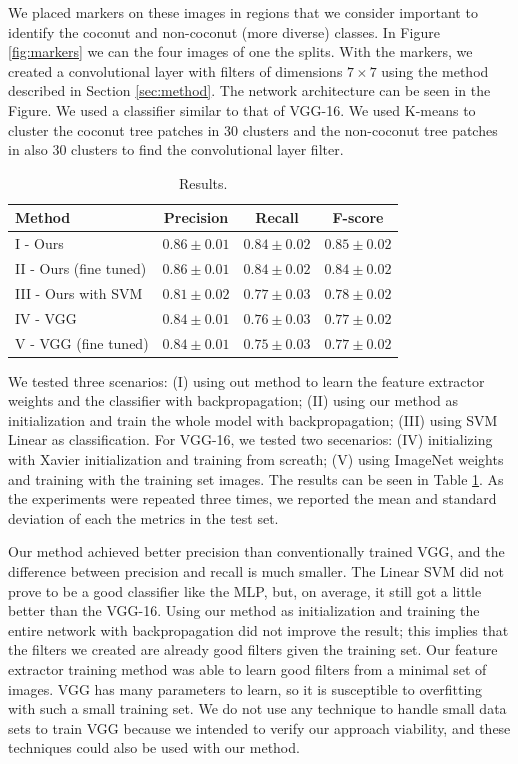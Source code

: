 \documentclass[a4paper,conference]{IEEEtran}
\begin{document}
We placed markers on these images in regions that we consider important to identify the coconut and non-coconut (more diverse) classes. In Figure \ref{fig:markers} we can the four images of one the splits. With the markers, we created a convolutional layer with filters of dimensions $7 \times 7$ using the method described in Section \ref{sec:method}. The network architecture can be seen in the Figure. We used a classifier similar to that of VGG-16. We used K-means to cluster the coconut tree patches in 30 clusters and the non-coconut tree patches in also 30 clusters to find the convolutional layer filter. 

\begin{table}[!t]
  \begin{center}
  \begin{tabular}{|l|c|c|c|}
  \hline
   Method & Precision & Recall & F-score \\
  \hline\hline
    I - Ours & $\boldsymbol{0.86 \pm 0.01}$ & $0.84 \pm 0.02$ & $0.85 \pm 0.02$\\
    II - Ours (fine tuned) & $0.86 \pm 0.01$ & $0.84 \pm 0.02$ & $0.84 \pm 0.02$\\
    III - Ours with SVM & $0.81 \pm 0.02$ & $0.77 \pm 0.03$ & $0.78 \pm 0.02$\\
    IV - VGG & $0.84 \pm 0.01$ & $0.76 \pm 0.03$ & $0.77 \pm 0.02 $ \\
    V - VGG (fine tuned) & $0.84 \pm 0.01$ & $0.75 \pm 0.03$ & $0.77 \pm 0.02 $ \\
  \hline
  \end{tabular}
  \end{center}
  \caption{Results.}
  \label{tab:results}
\end{table}

We tested three scenarios: (I) using out method to learn the feature extractor weights and the classifier with backpropagation; (II) using our method as initialization and train the whole model with backpropagation; (III) using SVM Linear as classification. For VGG-16, we tested two secenarios: (IV) initializing with Xavier initialization and training from screath; (V) using ImageNet weights and training with the training set images. The results can be seen in Table \ref{tab:results}. As the experiments were repeated three times, we reported the mean and standard deviation of each the metrics in the test set. 

Our method achieved better precision than conventionally trained VGG, and the difference between precision and recall is much smaller. The Linear SVM did not prove to be a good classifier like the MLP, but, on average, it still got a little better than the VGG-16. Using our method as initialization and training the entire network with backpropagation did not improve the result; this implies that the filters we created are already good filters given the training set. Our feature extractor training method was able to learn good filters from a minimal set of images. VGG has many parameters to learn, so it is susceptible to overfitting with such a small training set. We do not use any technique to handle small data sets to train VGG because we intended to verify our approach viability, and these techniques could also be used with our method.
\end{document}
